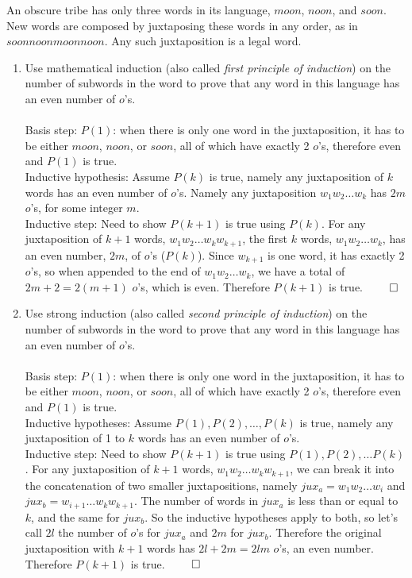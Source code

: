 \documentclass[12pt]{article}
\newenvironment{problem}[2][Problem]{\begin{trivlist}
\item[\hskip \labelsep {\bfseries #1}\hskip \labelsep {\bfseries #2.}]}{\end{trivlist}}
\begin{document}
\begin{problem}{2}
    An obscure tribe has only three words in its language, $moon$, $noon$, and $soon$. New
words are composed by juxtaposing these words in any order, as in $soonnoonmoonnoon$. Any such
juxtaposition is a legal word.

    \begin{enumerate}
    \item Use mathematical induction (also called \emph{first principle of induction}) 
    on the number of subwords in the word to prove that any word in this language has an even number of $o$'s.\\\\
    Basis step: $P(1)$: when there is only one word in the juxtaposition, 
    it has to be either $moon$, $noon$, or $soon$, 
    all of which have exactly 2 $o$'s, therefore even and $P(1)$ is true.\\
    Inductive hypothesis: Assume $P(k)$ is true, 
    namely any juxtaposition of $k$ words has an even number of $o$'s.
    Namely any juxtaposition $w_1w_2\ldots w_k$ has $2m$ $o$'s, for some integer $m$.\\
    Inductive step: Need to show $P(k+1)$ is true using $P(k)$. 
    For any juxtaposition of $k+1$ words, $w_1w_2 \ldots w_kw_{k+1}$, 
    the first $k$ words, $w_1w_2\ldots w_k$, has an even number, $2m$, of $o$'s ($P(k)$).
    Since $w_{k+1}$ is one word, it has exactly 2 $o$'s, so when appended to the end of $w_1w_2\ldots w_k$,
    we have a total of $2m+2 = 2(m+1)$ $o$'s, which is even. Therefore $P(k+1)$ is true. $\qed$
    
    \item Use strong induction (also called \emph{second principle of induction}) 
    on the number of subwords in the word to prove that any word in this language has an even number of $o$'s.\\\\
    Basis step: $P(1)$: when there is only one word in the juxtaposition, 
    it has to be either $moon$, $noon$, or $soon$, 
    all of which have exactly 2 $o$'s, therefore even and $P(1)$ is true.\\
    Inductive hypotheses: Assume $P(1),P(2),\ldots,P(k)$ is true, 
    namely any juxtaposition of 1 to $k$ words has an even number of $o$'s.\\
    Inductive step: Need to show $P(k+1)$ is true using $P(1),P(2),\ldots P(k)$.
    For any juxtaposition of $k+1$ words, $w_1w_2 \ldots w_kw_{k+1}$,
    we can break it into the concatenation of two smaller juxtapositions, namely $jux_a = w_1w_2\ldots w_i$
    and $jux_b = w_{i+1}\ldots w_kw_{k+1}$. 
    The number of words in $jux_a$ is less than or equal to $k$, and the same for $jux_b$.
    So the inductive hypotheses apply to both, so let's call $2l$ the number of $o$'s for $jux_a$ and $2m$ for $jux_b$.
    Therefore the original juxtaposition with $k+1$ words has $2l + 2m = 2lm$ $o$'s, an even number.
    Therefore $P(k+1)$ is true. $\qed$
    \end{enumerate}
\end{problem}
\end{document}
